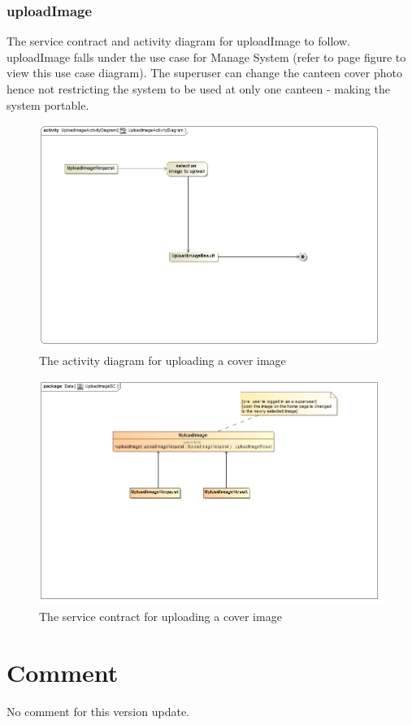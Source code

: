 \documentclass[a4paper,12pt]{article}
\begin{document}
\subsubsection{uploadImage}
The service contract and activity diagram for uploadImage to follow. uploadImage falls under the use case for Manage System (refer to page   figure   to view this use case diagram). The superuser can change the canteen cover photo hence not restricting the system to be used at only one canteen - making the system portable. 
\begin{figure}[H]
  \centering
    \includegraphics[width=1.0\textwidth]{../images/UploadImageActivityDiagram.jpg}
    \caption{The activity diagram for uploading a cover image} 
\end{figure}

\begin{figure}[H]
	\centering
	\includegraphics[width=1.0\textwidth]{../images/UploadImageSC.jpg}
	\caption{The service contract for uploading a cover image}
\end{figure}


\section{Comment}
No comment for this version update.
\end{document}
